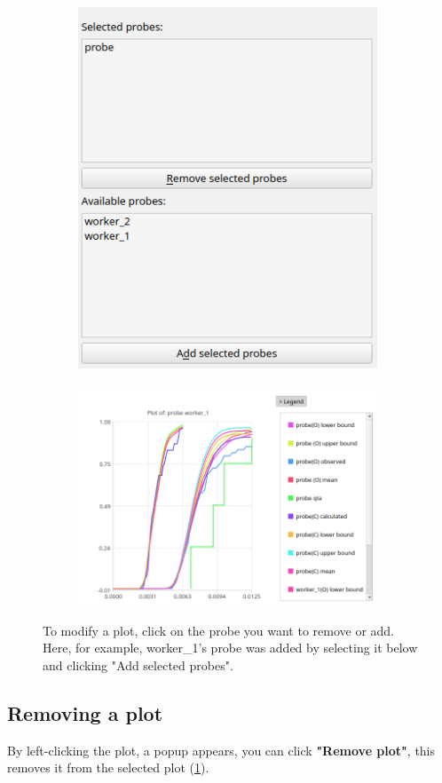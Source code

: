         \begin{figure}[H]
            \centering
            \begin{subfigure}{.5\textwidth}
                \centering
                \includegraphics[width=0.98\textwidth]{img/manual/modify_plot.png}
            \end{subfigure}%
            \begin{subfigure}{.5\textwidth}
                \centering
                \includegraphics[width =0.98\textwidth]{img/manual/added_plot.png}
            \end{subfigure}
            \caption{To modify a plot, click on the probe you want to remove or add. Here, for example, worker\_1's probe was added by selecting it below and clicking "Add selected probes".}
            \label{fig:edit_pl}
        \end{figure}

\subsection{Removing a plot}
    By left-clicking the plot, a popup appears, you can click \textbf{"Remove plot"}, this removes it from the selected plot (\cref{fig:edit_pl}).
